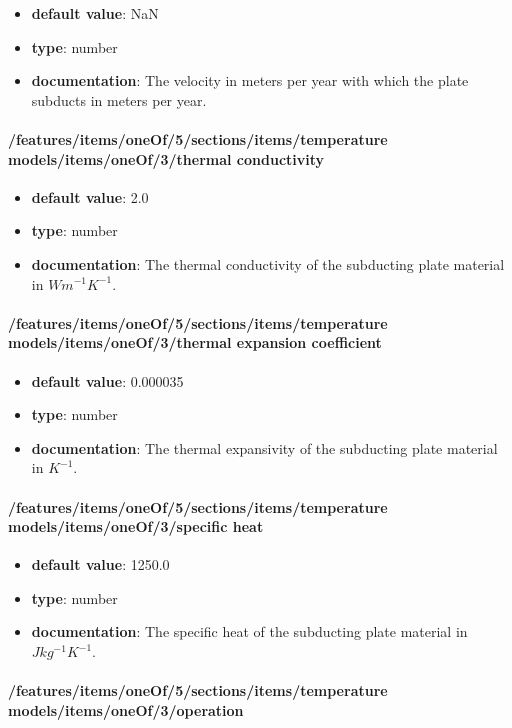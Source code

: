 \begin{itemize}\item {\bf default value}: NaN
\item {\bf type}: number
\item {\bf documentation}: The velocity in meters per year with which the plate subducts in meters per year.
\end{itemize}\paragraph{/features/items/oneOf/5/sections/items/temperature models/items/oneOf/3/thermal conductivity}
\begin{itemize}\item {\bf default value}: 2.0
\item {\bf type}: number
\item {\bf documentation}: The thermal conductivity of the subducting plate material in $W m^{-1} K^{-1}$.
\end{itemize}\paragraph{/features/items/oneOf/5/sections/items/temperature models/items/oneOf/3/thermal expansion coefficient}
\begin{itemize}\item {\bf default value}: 0.000035
\item {\bf type}: number
\item {\bf documentation}: The thermal expansivity of the subducting plate material in $K^{-1}$.
\end{itemize}\paragraph{/features/items/oneOf/5/sections/items/temperature models/items/oneOf/3/specific heat}
\begin{itemize}\item {\bf default value}: 1250.0
\item {\bf type}: number
\item {\bf documentation}: The specific heat of the subducting plate material in $J kg^{-1} K^{-1}$.
\end{itemize}\paragraph{/features/items/oneOf/5/sections/items/temperature models/items/oneOf/3/operation}
